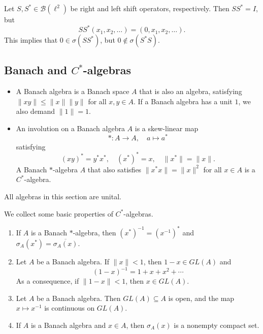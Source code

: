 \begin{example}
  Let $S, S^* \in \mathcal{B}(\ell^2)$ be right and left shift operators, respectively.
  Then $S S^* = I$, but $$S S^* (x_1, x_2, \dots) = (0, x_1, x_2, \dots).$$
  This implies that $0 \in \sigma (S S^*)$, but $0 \notin \sigma (S^* S)$.
\end{example}

\subsection{Banach and $C^*$-algebras}

\begin{definition}
  \begin{itemize}
    \item A Banach algebra is a Banach space $A$ that is also an algebra, satisfying $\|xy\| \leq \|x\| \|y\|$ for all $x, y \in A$.
    If a Banach algebra has a unit $1$, we also demand $\|1\| = 1$.
    \item An involution on a Banach algebra $A$ is a skew-linear map $$*: A \to A,\quad a \mapsto a^*$$
    satisfying $$(xy)^* = y^* x^*,\quad (x^*)^* = x,\quad \|x^*\| = \|x\|.$$
    A Banach $*$-algebra $A$ that also satisfies $\|x^* x\| = \|x\|^2$ for all $x \in A$ is a $C^*$-algebra.
  \end{itemize}
\end{definition}

All algebras in this section are unital.

\begin{proposition}
  We collect some basic properties of $C^*$-algebras.
  \begin{enumerate}
    \item If $A$ is a Banach $*$-algebra, then 
    $(x^*)^{-1} = (x^{-1})^*$ and $\sigma_A (x^*) = \overline{\sigma_A (x)}.$
    \item Let $A$ be a Banach algebra. If $\|x\| < 1$, then $1 - x \in GL (A)$ and 
    $$(1 - x)^{-1} = 1 + x + x^2 + \cdots$$ As a consequence, if $\| 1 - x\| < 1$, then $x \in GL (A)$.
    \item Let $A$ be a Banach algebra. Then $GL(A) \subseteq A$ is open, and the map $x \mapsto x^{-1}$ is continuous on $GL (A)$.
    \item If $A$ is a Banach algebra and $x \in A$, then $\sigma_A (x)$ is a nonempty compact set.
  \end{enumerate}
\end{proposition}

